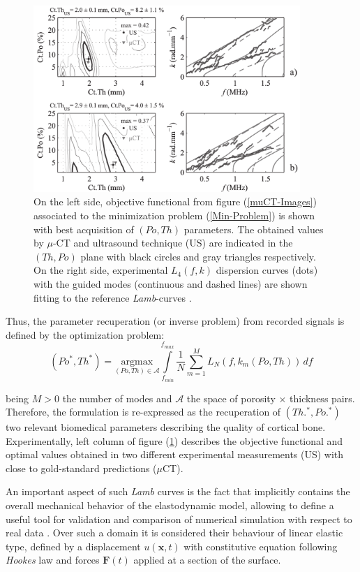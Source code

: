 \begin{figure}[!h]
	\centering
	\includegraphics[width=0.9\textwidth]{images/ImgExt/FKDiagramTwoCases.png}
	\caption{On the left side, objective functional from figure (\ref{muCT-Images}) associated to the minimization problem (\ref{Min-Problem}) is shown with best acquisition of $(Po, Th)$ parameters. The obtained values by $\mu$-CT and ultrasound technique (US) are indicated in the $(Th, Po)$ plane with black circles and gray triangles respectively. On the right side, experimental $L_4(f,k)$ dispersion curves (dots) with the guided modes (continuous and dashed lines) are shown fitting to the reference \textit{Lamb}-curves \cite{Minonzio2018}.}
	\label{RealLM-Images}
\end{figure}

Thus, the parameter recuperation (or inverse problem) from recorded signals is defined by the optimization problem:
\begin{equation}
    (Po^*, Th^*) = \underset{(Po, Th) \in \mathcal{A}}{\text{argmax}} \int\limits_{f_{min}}^{f_{max}} \frac{1}{N} \sum_{m=1}^{M} L_N(f, k_m(Po, Th)) \,df 
    \label{Min-Problem}
\end{equation}

being $M>0$ the number of modes and $\mathcal{A}$ the space of porosity $\times$ thickness pairs. Therefore, the formulation is re-expressed as the recuperation of $(Th.^*, Po.^*)$ two relevant biomedical parameters describing the quality of cortical bone. 
Experimentally, left column of figure (\ref{RealLM-Images}) describes the objective functional and optimal values obtained in two different experimental measurements (US) with close to gold-standard predictions ($\mu$CT).

An important aspect of such \textit{Lamb} curves is the fact that implicitly contains the overall mechanical behavior of the elastodynamic model, allowing to define a useful tool for validation and comparison of numerical simulation with respect to real data  \cite{Rhee2007}. Over such a domain it is considered their behaviour of linear elastic type, defined by a displacement $u(\mathbf{x},t)$ with constitutive equation following \textit{Hookes} law and forces $\mathbf{F}(t)$ applied at a section of the surface.


